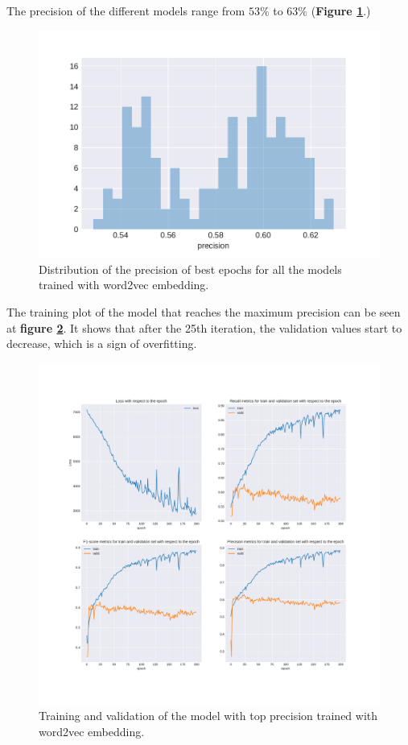 The precision of the different models range from $53\%$ to $63\%$ (\textbf{Figure \ref{fig:chap4:att1:distPrecision}}.)
\begin{figure}
 \centering
 \includegraphics[width=\textwidth]{images/chapitre4/distplot_precision_liar_attention_word2vec}
 \caption{Distribution of the precision of best epochs for all the models trained with word2vec embedding.}
 \label{fig:chap4:att1:distPrecision}
\end{figure}
The training plot of the model that reaches the maximum precision can be seen at \textbf{figure \ref{fig:chap4:att1:train}}. It shows that after the 25th iteration, the validation values start to decrease, which is a sign of overfitting. \\
\begin{figure}
 \centering
 \includegraphics[width=\textwidth]{images/chapitre4/attention1}
 \caption{Training and validation of the model with top precision trained with word2vec embedding.}
 \label{fig:chap4:att1:train}
\end{figure}
